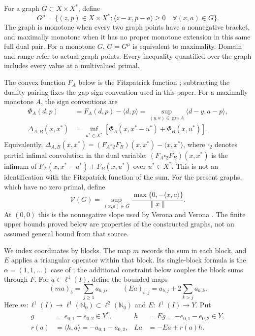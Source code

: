 \documentclass[11pt]{article}
\newcommand{\Nzero}{\mathbb N_0}
\newcommand{\gra}{\operatorname{gra}}
\newcommand{\pair}[2]{\langle #1,#2\rangle}
\begin{document}
For a graph $G\subset X\times X^*$, define
\begin{equation}
G^\mu=\{(z,p)\in X\times X^*:
 \pair{z-x}{p-a}\ge0\quad\forall(x,a)\in G\}.
\tag{D1}\label{eq:D1}
\end{equation}
The graph is monotone when every two graph points have a nonnegative bracket,
and maximally monotone when it has no proper monotone extension in this same
full dual pair. For a monotone $G$, $G=G^\mu$ is equivalent to maximality.
Domain and range refer to actual graph points. Every inequality quantified
over the graph includes every value at a multivalued primal.

\ifdefined\expandedversion
The convex function $F_A$ below is the Fitzpatrick function
\cite{fitzpatrick1988}; subtracting the duality pairing fixes the gap
sign convention used in this paper.
For a maximally monotone $A$, the sign conventions are
\begin{equation}
\begin{aligned}
\Phi_A(d,p)&=F_A(d,p)-\pair{d}{p}
 =\sup_{(y,a)\in\gra A}\pair{d-y}{a-p},\\
\Delta_{A,B}(x,x^*)&=\inf_{u^*\in X^*}
 [\Phi_A(x,x^*-u^*)+\Phi_B(x,u^*)].
\end{aligned}
\tag{D2}\label{eq:D2}
\end{equation}
Equivalently, $\Delta_{A,B}(x,x^*)=(F_A\square_2 F_B)(x,x^*)
-\pair{x}{x^*}$, where $\square_2$ denotes partial infimal convolution
in the dual variable: $(F_A\square_2 F_B)(x,x^*)$
is the infimum of $F_A(x,x^*-u^*)+F_B(x,u^*)$ over $u^*\in X^*$.
This is not an identification with the Fitzpatrick function of the sum.
\fi
For the present graphs, which have no zero primal, define
\begin{equation}
\mathcal V(G)=\sup_{(x,a)\in G}
 \frac{\max\{0,-\pair{x}{a}\}}{\|x\|}.
\tag{D3}\label{eq:D3}
\end{equation}
At $(0,0)$ this is the nonnegative slope used by Verona and Verona
\cite{verona2008}. The finite upper bounds proved below are properties
of the constructed graphs, not an assumed general bound from that source.

We index coordinates by blocks. The map $m$ records the sum in each block,
and $E$ applies a triangular operator within that block. Its single-block
formula is the $\alpha=(1,1,\ldots)$ case of
\cite[author version, Example~4.1]{bauschkeetal2011}; the additional constraint below
couples the block sums through $F$.
For $a\in\ell^1(I)$, define the bounded maps
\begin{equation}
(ma)_b=\sum_{j\ge1}a_{b,j},\qquad
(Ea)_{b,j}=a_{b,j}+2\sum_{k>j}a_{b,k}.
\tag{D4}\label{eq:D4}
\end{equation}
Here $m:\ell^1(I)\to\ell^1(\Nzero)\subset\ell^2(\Nzero)$ and
$E:\ell^1(I)\to Y$. Put
\begin{equation}
\begin{aligned}
g&=e_{0,1}-e_{0,2}\in Y^*,&
h&=Eg=-e_{0,1}-e_{0,2}\in Y,\\
r(a)&=\pair{h}{a}=-a_{0,1}-a_{0,2},&
La&=-Ea+r(a)h.
\end{aligned}
\tag{D5}\label{eq:D5}
\end{equation}
\end{document}
